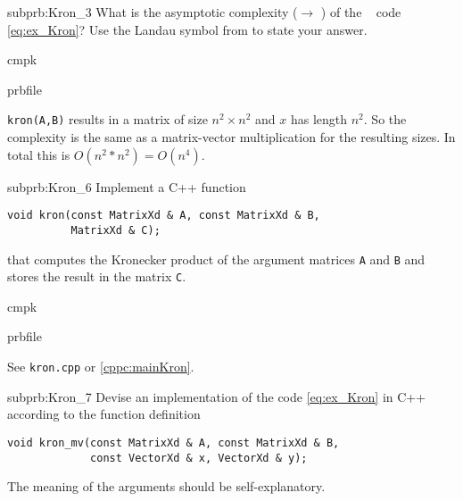 \begin{samproblem}
\begin{subproblem}{subprb:Kron_3}
What is the asymptotic complexity ($\to$ )
of the \Matlab~ code \eqref{eq:ex_Kron}? Use the Landau symbol
from  to state your answer.

\begin{samwriteprbpart}{cmpk}
  \begin{writeverbatim}{prbfile}
    \begin{samsolution}
      \texttt{kron(A,B)} results in a matrix of size $n^2 \times n^2$ and $x$
      has length $n^2$. So the complexity is the same as a matrix-vector
      multiplication for the resulting sizes. In total this is $O(n^2*n^2)=O(n^4)$.
      \end{samsolution}
    \end{writeverbatim}
  \end{samwriteprbpart}
\end{subproblem}

\begin{subproblem}{subprb:Kron_6}
Implement a C++ function
\begin{lstlisting}[style=cppsimple]
void kron(const MatrixXd & A, const MatrixXd & B,
          MatrixXd & C);
\end{lstlisting}
that computes the Kronecker product of the argument matrices
\texttt{A} and \texttt{B} and stores the result in the matrix \texttt{C}.

\begin{samwriteprbpart}{cmpk}
  \begin{writeverbatim}{prbfile}
    \begin{samsolution}
      See \texttt{kron.cpp} or \cref{cppc:mainKron}.
    \end{samsolution}
  \end{writeverbatim}
\end{samwriteprbpart}
\end{subproblem}

\begin{subproblem}{subprb:Kron_7}
  Devise an implementation of the \matlab{} code \eqref{eq:ex_Kron}
  in C++ according
  to the function definition
  \begin{lstlisting}[style=cppsimple]
void kron_mv(const MatrixXd & A, const MatrixXd & B,
             const VectorXd & x, VectorXd & y);
  \end{lstlisting}
  The meaning of the arguments should be self-explanatory.


\end{subproblem}
\end{samproblem}
